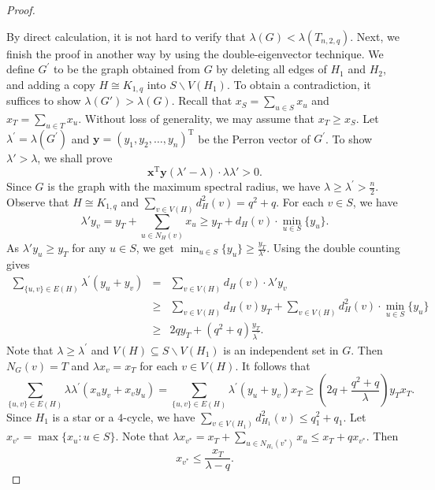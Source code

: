 \documentclass[11pt]{article}
\begin{document}
\begin{proof}
\begin{itemize}
\end{itemize} 
By direct calculation, it is not hard to verify that $\lambda (G)< \lambda (T_{n,2,q})$. 
Next, we finish the proof in another way by using the double-eigenvector technique. 
We define $G^{\prime}$ to be the graph 
 obtained from $G$ by deleting all edges of $H_1$ and $H_2$, and adding a copy $H\cong K_{1,q}$ into $S \backslash V(H_1)$.  
 To obtain a contradiction, it suffices to show $\lambda (G') > \lambda (G)$. 
Recall that $x_S = \sum_{u\in S} x_u$ and $x_T=\sum_{u\in T} x_u$. 
Without loss of generality, 
 we may assume  that $x_{T} \geq x_{S}$. 
 Let $\lambda^{\prime}=\lambda\left(G^{\prime}\right)$ and $\bm{y}=\left(y_1, y_2, \ldots, y_n\right)^{\mathrm{T}}$ be the Perron vector of $G^{\prime}$. 
 To show $\lambda' > \lambda $, we shall prove 
 \[  \bm{x}^{\mathrm{T}}\bm{y} (\lambda '- \lambda) 
 \cdot \lambda \lambda ' >0. \]
 Since $G$ is the graph with the maximum spectral radius, 
 we have 
 $\lambda \geq \lambda^{\prime}  > \frac{n}{2}$.
 Observe that $H\cong K_{1,q}$ and 
$\sum_{v\in V(H)} d_H^2(v)= q^2+q$. 
For each $v\in S$, we have 
 \[  \lambda ' y_v = y_T + \sum_{u\in N_H(v)} x_u \ge 
 y_T + d_H(v) \cdot \min_{u\in S} \{ y_u \}. \] 
As $\lambda' y_u \ge y_T$ for any $u\in S$, we get 
$\min_{u\in S} \{ y_u\} \ge \frac{y_T}{ \lambda'}$.  
Using the double counting gives 
\begin{eqnarray*} 
\sum_{\{u,v\} \in E(H)} \lambda^{\prime} (y_u+y_v ) 
&= &  \sum_{v\in V(H)} d_{H}(v) \cdot \lambda ' y_v  \\
&\geq & \sum_{v \in V(H)} d_H(v) y_{T}+\sum_{v \in V(H)} d_H^2(v) \cdot \min _{u \in S} \{y_u\} \\ 
&\ge & 2 q y_T + (q^2+q ) \frac{y_T}{\lambda^{\prime}}. 
\end{eqnarray*} 
Note that $\lambda \geq \lambda^{\prime}$ 
and $V(H) \subseteq S \backslash V(H_1)$ 
is an independent set in $G$. 
Then $N_{G}(v)=T$ and $\lambda x_v=x_{T}$
 for each $v \in V(H)$.  
 It follows that
\begin{equation}  \label{eq-11}
\sum_{\{u, v\} \in E(H)} \lambda \lambda^{\prime}\left(x_u y_v+x_v y_u\right)=\sum_{\{u, v\} \in E(H)} \lambda^{\prime}\left(y_u+y_v\right) x_{T} 
\geq \left(2 q+\frac{q^2+q}{\lambda}\right) y_{T} x_{T} .
\end{equation}
Since $H_1$ is a star or a $4$-cycle, 
we have $\sum_{v \in V\left(H_1\right)} d_{H_1}^2(v) \le  q_1^2+q_1$. 
Let $x_{v^*} =\max\{x_u: u\in S\}$. 
Note that $\lambda x_{v^*} = x_T + \sum_{u\in N_{H_1}(v^*)} x_u \le x_T + q x_{v^*}$. Then 
\[   x_{v^*}  \leq \frac{x_{T}}{\lambda- q}. \]  

\end{proof}
\end{document}
